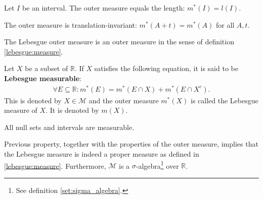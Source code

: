 
    \begin{property}
        Let $I$ be an interval. The outer measure equals the length: $m^*(I) = l(I)$.
    \end{property}
    \begin{property}
        The outer measure is translation-invariant: $m^*(A + t) = m^*(A)$ for all $A,t$.
    \end{property}
    \begin{property}
        The Lebesgue outer measure is an outer measure in the sense of definition \ref{lebesgue:measure}.
    \end{property}

    \begin{theorem}\label{lebesgue:lebesgue_measure}
        Let $X$ be a subset of $\mathbb{R}$. If $X$ satisfies the following equation, it is said to be \textbf{Lebesgue measurable}:
        \begin{gather}
            \forall E\subseteq\mathbb{R}:m^*(E) = m^*(E\cap X) + m^*(E\cap X^c).
        \end{gather}
        This is denoted by $X\in\mathcal{M}$ and the outer measure $m^*(X)$ is called the Lebesgue measure of $X$. It is denoted by $m(X)$.
    \end{theorem}
    \begin{property}
        All null sets and intervals are measurable.
    \end{property}
    \begin{remark}
       Previous property, together with the properties of the outer measure, implies that the Lebesgue measure is indeed a proper measure as defined in \ref{lebesgue:measure}. Furthermore, $\mathcal{M}$ is a $\sigma$-algebra\footnote{See definition \ref{set:sigma_algebra}.} over $\mathbb{R}$.
    \end{remark}

